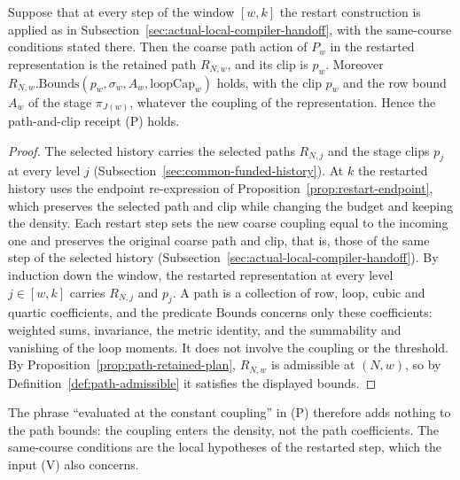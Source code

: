 \begin{lemma}
\label{lem:rank-trace-path-part}
Suppose that at every step of the window $[w,k]$ the restart construction
is applied as in Subsection~\ref{sec:actual-local-compiler-handoff}, with the
same-course conditions stated there. Then the coarse path action of $P_w$
in the restarted representation is the retained path $R_{N,w}$, and its
clip is $p_w$. Moreover
$R_{N,w}.\mathrm{Bounds}(p_w,\sigma_w,A_w,\mathrm{loopCap}_w)$ holds, with
the clip $p_w$ and the row bound $A_w$ of the stage $\pi_{J(w)}$, whatever
the coupling of the representation. Hence the path-and-clip receipt (P) holds.
\end{lemma}
\begin{proof}
The selected history carries the selected paths $R_{N,j}$ and the stage
clips $p_j$ at every level $j$ (Subsection~\ref{sec:common-funded-history}). At
$k$ the restarted history uses the endpoint re-expression of
Proposition~\ref{prop:restart-endpoint}, which preserves the selected
path and clip while changing the budget and keeping the density. Each restart step sets the new coarse coupling equal to the
incoming one and preserves the original coarse path and clip, that is,
those of the same step of the selected history
(Subsection~\ref{sec:actual-local-compiler-handoff}). By induction down the
window, the restarted representation at every level $j\in[w,k]$ carries
$R_{N,j}$ and $p_j$. A path is a collection of row, loop, cubic and
quartic coefficients, and the predicate $\mathrm{Bounds}$ concerns only
these coefficients: weighted sums, invariance, the metric identity, and
the summability and vanishing of the loop moments. It does not involve the
coupling or the threshold. By Proposition~\ref{prop:path-retained-plan},
$R_{N,w}$ is admissible at $(N,w)$, so by
Definition~\ref{def:path-admissible} it satisfies the displayed bounds.
\end{proof}

The phrase ``evaluated at the constant coupling'' in (P) therefore adds
nothing to the path bounds: the coupling enters the density, not the path
coefficients. The same-course conditions are the local hypotheses of the
restarted step, which the input (V) also concerns.

